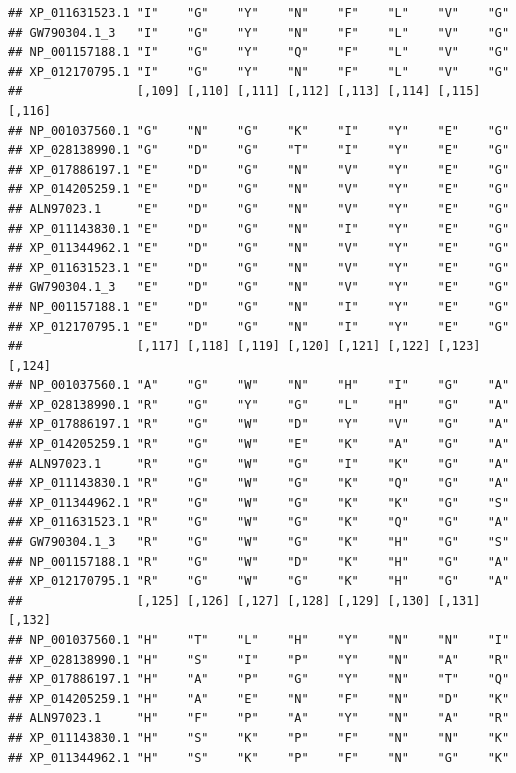 \documentclass[]{article}
\begin{document}
\begin{verbatim}
## XP_011631523.1 "I"    "G"    "Y"    "N"    "F"    "L"    "V"    "G"   
## GW790304.1_3   "I"    "G"    "Y"    "N"    "F"    "L"    "V"    "G"   
## NP_001157188.1 "I"    "G"    "Y"    "Q"    "F"    "L"    "V"    "G"   
## XP_012170795.1 "I"    "G"    "Y"    "N"    "F"    "L"    "V"    "G"   
##                [,109] [,110] [,111] [,112] [,113] [,114] [,115] [,116]
## NP_001037560.1 "G"    "N"    "G"    "K"    "I"    "Y"    "E"    "G"   
## XP_028138990.1 "G"    "D"    "G"    "T"    "I"    "Y"    "E"    "G"   
## XP_017886197.1 "E"    "D"    "G"    "N"    "V"    "Y"    "E"    "G"   
## XP_014205259.1 "E"    "D"    "G"    "N"    "V"    "Y"    "E"    "G"   
## ALN97023.1     "E"    "D"    "G"    "N"    "V"    "Y"    "E"    "G"   
## XP_011143830.1 "E"    "D"    "G"    "N"    "I"    "Y"    "E"    "G"   
## XP_011344962.1 "E"    "D"    "G"    "N"    "V"    "Y"    "E"    "G"   
## XP_011631523.1 "E"    "D"    "G"    "N"    "V"    "Y"    "E"    "G"   
## GW790304.1_3   "E"    "D"    "G"    "N"    "V"    "Y"    "E"    "G"   
## NP_001157188.1 "E"    "D"    "G"    "N"    "I"    "Y"    "E"    "G"   
## XP_012170795.1 "E"    "D"    "G"    "N"    "I"    "Y"    "E"    "G"   
##                [,117] [,118] [,119] [,120] [,121] [,122] [,123] [,124]
## NP_001037560.1 "A"    "G"    "W"    "N"    "H"    "I"    "G"    "A"   
## XP_028138990.1 "R"    "G"    "Y"    "G"    "L"    "H"    "G"    "A"   
## XP_017886197.1 "R"    "G"    "W"    "D"    "Y"    "V"    "G"    "A"   
## XP_014205259.1 "R"    "G"    "W"    "E"    "K"    "A"    "G"    "A"   
## ALN97023.1     "R"    "G"    "W"    "G"    "I"    "K"    "G"    "A"   
## XP_011143830.1 "R"    "G"    "W"    "G"    "K"    "Q"    "G"    "A"   
## XP_011344962.1 "R"    "G"    "W"    "G"    "K"    "K"    "G"    "S"   
## XP_011631523.1 "R"    "G"    "W"    "G"    "K"    "Q"    "G"    "A"   
## GW790304.1_3   "R"    "G"    "W"    "G"    "K"    "H"    "G"    "S"   
## NP_001157188.1 "R"    "G"    "W"    "D"    "K"    "H"    "G"    "A"   
## XP_012170795.1 "R"    "G"    "W"    "G"    "K"    "H"    "G"    "A"   
##                [,125] [,126] [,127] [,128] [,129] [,130] [,131] [,132]
## NP_001037560.1 "H"    "T"    "L"    "H"    "Y"    "N"    "N"    "I"   
## XP_028138990.1 "H"    "S"    "I"    "P"    "Y"    "N"    "A"    "R"   
## XP_017886197.1 "H"    "A"    "P"    "G"    "Y"    "N"    "T"    "Q"   
## XP_014205259.1 "H"    "A"    "E"    "N"    "F"    "N"    "D"    "K"   
## ALN97023.1     "H"    "F"    "P"    "A"    "Y"    "N"    "A"    "R"   
## XP_011143830.1 "H"    "S"    "K"    "P"    "F"    "N"    "N"    "K"   
## XP_011344962.1 "H"    "S"    "K"    "P"    "F"    "N"    "G"    "K"   

\end{verbatim}
\end{document}
